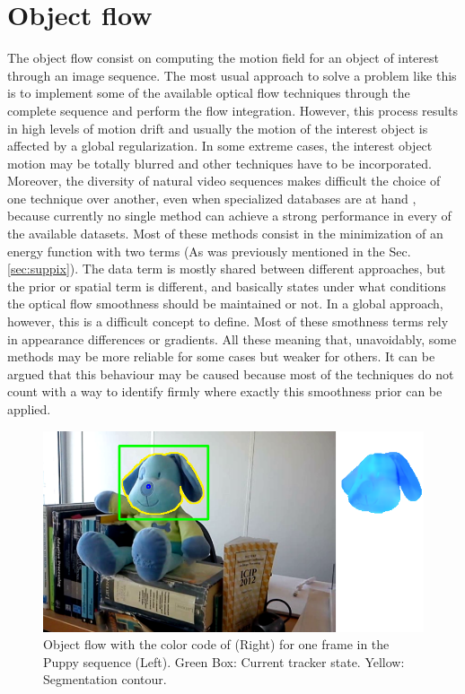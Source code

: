 \section{Object flow}
\label{sec:core}

The object flow consist on computing the motion field for an object of interest through an image
sequence. The most usual approach to solve a problem like this is to implement some of the available
optical flow techniques through the complete sequence and perform the flow integration. 
However, this process results in high levels of motion drift \cite{c18}\cite{c19} and usually the motion of the interest
object is affected by a global regularization. In some extreme cases, the interest object motion
may be totally blurred and other techniques have to be incorporated. Moreover, the diversity
of natural video sequences makes difficult the choice of one technique over another, even when specialized
databases are at hand \cite{c17}, because currently no single method can achieve a strong 
performance in every of the available datasets. Most of these methods consist in the minimization 
of an energy function with two terms (As was previously mentioned in the Sec. \ref{sec:suppix}). The data
term is mostly shared between different approaches, but the prior or spatial term is different, and basically states 
under what conditions the optical flow smoothness should be maintained or not. In a global approach, however,
this is a difficult concept to define. Most of these smothness terms rely in appearance differences or gradients.
All these meaning that, unavoidably, some methods may be more reliable for some cases but weaker for others. 
It can be argued that this behaviour may be caused because most of the techniques do not count with a way to identify 
firmly where exactly this smoothness prior can be applied. 
   \begin{figure}[thpb]
      \centering
      \includegraphics[height=0.33\textheight]{images/object_flow.png}
      \caption{Object flow with the color code of \cite{c17} (Right) for one frame in the Puppy sequence (Left). Green Box: Current tracker state. Yellow: Segmentation contour.  }
      \label{of}
   \end{figure}

